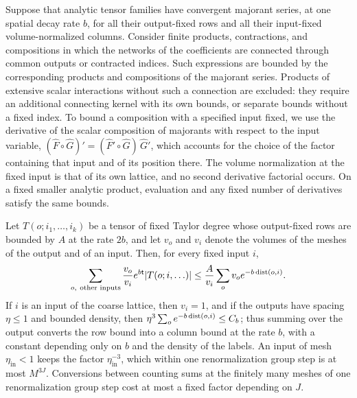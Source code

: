 \begin{lemma}\label{ch10:lem:positive-composition}
Suppose that analytic tensor families have convergent majorant series, at one spatial decay rate $b$, for all their output-fixed rows and all their input-fixed volume-normalized columns. Consider finite products, contractions, and compositions in which the networks of the coefficients are connected through common outputs or contracted indices. Such expressions are bounded by the corresponding products and compositions of the majorant series. Products of extensive scalar interactions without such a connection are excluded: they require an additional connecting kernel with its own bounds, or separate bounds without a fixed index. To bound a composition with a specified input fixed, we use the derivative of the scalar composition of majorants with respect to the input variable, $(\widehat F\circ\widehat G)'=(\widehat F'\circ\widehat G)\,\widehat G'$, which accounts for the choice of the factor containing that input and of its position there. The volume normalization at the fixed input is that of its own lattice, and no second derivative factorial occurs. On a fixed smaller analytic product, evaluation and any fixed number of derivatives satisfy the same bounds.

Let $T(o;i_1,\ldots,i_k)$ be a tensor of fixed Taylor degree whose output-fixed rows are bounded by $A$ at the rate $2b$, and let $v_o$ and $v_i$ denote the volumes of the meshes of the output and of an input. Then, for every fixed input $i$,
\begin{equation}\label{ch10:eq:row-to-column}
 \sum_{o,\ \text{other inputs}}\frac{v_o}{v_i}e^{b\mathsf t}\lvert T(o;i,\ldots)\rvert\le\frac A{v_i}\sum_ov_oe^{-b\operatorname{dist}(o,i)}.
\end{equation}
If $i$ is an input of the coarse lattice, then $v_i=1$, and if the outputs have spacing $\eta\le1$ and bounded density, then $\eta^3\sum_oe^{-b\operatorname{dist}(o,i)}\le C_b$; thus summing over the output converts the row bound into a column bound at the rate $b$, with a constant depending only on $b$ and the density of the labels. An input of mesh $\eta_{\mathrm{in}}<1$ keeps the factor $\eta_{\mathrm{in}}^{-3}$, which within one renormalization group step is at most $M^{3J}$. Conversions between counting sums at the finitely many meshes of one renormalization group step cost at most a fixed factor depending on $J$.


\end{lemma}
